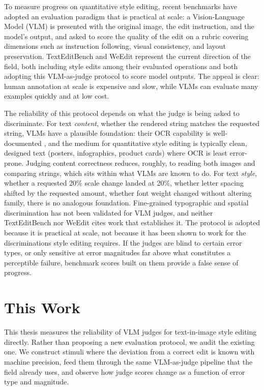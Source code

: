 To measure progress on quantitative style editing, recent benchmarks have adopted an evaluation paradigm that is practical at scale: a Vision-Language Model (VLM) is presented with the original image, the edit instruction, and the model's output, and asked to score the quality of the edit on a rubric covering dimensions such as instruction following, visual consistency, and layout preservation. TextEditBench \cite{gui2025texteditbench} and WeEdit \cite{zhang2026weedit} represent the current direction of the field, both including style edits among their evaluated operations and both adopting this VLM-as-judge protocol to score model outputs. The appeal is clear: human annotation at scale is expensive and slow, while VLMs can evaluate many examples quickly and at low cost.

The reliability of this protocol depends on what the judge is being asked to discriminate. For text \textit{content}, whether the rendered string matches the requested string, VLMs have a plausible foundation: their OCR capability is well-documented \cite{liu2024ocrbench, fu2025ocrbenchv2}, and the medium for quantitative style editing is typically clean, designed text (posters, infographics, product cards) where OCR is least error-prone. Judging content correctness reduces, roughly, to reading both images and comparing strings, which sits within what VLMs are known to do. For text \textit{style}, whether a requested 20\% scale change landed at 20\%, whether letter spacing shifted by the requested amount, whether font weight changed without altering family, there is no analogous foundation. Fine-grained typographic and spatial discrimination has not been validated for VLM judges, and neither TextEditBench nor WeEdit cites work that establishes it. The protocol is adopted because it is practical at scale, not because it has been shown to work for the discriminations style editing requires. If the judges are blind to certain error types, or only sensitive at error magnitudes far above what constitutes a perceptible failure, benchmark scores built on them provide a false sense of progress.


\section{This Work}

\label{This Work}

This thesis measures the reliability of VLM judges for text-in-image style editing directly. Rather than proposing a new evaluation protocol, we audit the existing one. We construct stimuli where the deviation from a correct edit is known with machine precision, feed them through the same VLM-as-judge pipeline that the field already uses, and observe how judge scores change as a function of error type and magnitude.

